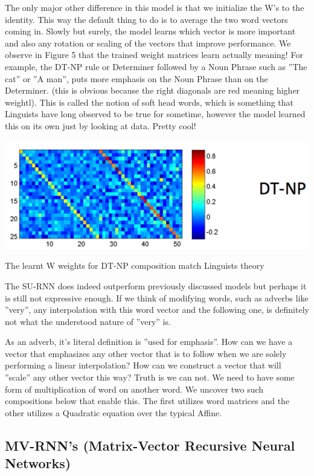 \documentclass{tufte-handout}
\begin{document}
The only major other difference in this model is that we initialize the W's to the identity. This way the default thing to do is to average the two word vectors coming in. Slowly but surely, the model learns which vector is more important and also any rotation or scaling of the vectors that improve performance. We observe in Figure 5 that the trained weight matrices learn actually meaning!  For example, the DT-NP rule or Determiner followed by a Noun Phrase such as ''The cat'' or ''A man'', puts more emphasis on the Noun Phrase than on the Determiner. (this is obvious because the right diagonals are red meaning higher weightl). This is called the notion of soft head words, which is something that Linguists have long observed to be true for sometime, however the model learned this on its own just by looking at data. Pretty cool!

\begin{marginfigure}%
  \includegraphics[width=\linewidth]{img5}
  \caption{The learnt W weights for DT-NP composition match Linguists theory }
  \label{fig:img5}
\end{marginfigure}

The SU-RNN does indeed outperform previously discussed models but perhaps it is still not expressive enough. If we think of modifying words, such as adverbs like ''very'', any interpolation with this word vector and the following one, is definitely not what the understood nature of ''very'' is. 

As an adverb, it's literal definition is ''used for emphasis''. How can we have a vector that emphasizes any other vector that is to follow when we are solely performing a linear interpolation? How can we construct a vector that will ''scale'' any other vector this way? Truth is we can not. We need to have some form of multiplication of word on another word. We uncover two such compositions below that enable this. The first utilizes word matrices and the other utilizes a Quadratic equation over the typical Affine. 


\subsection{MV-RNN's (Matrix-Vector Recursive Neural Networks)}
\end{document}
